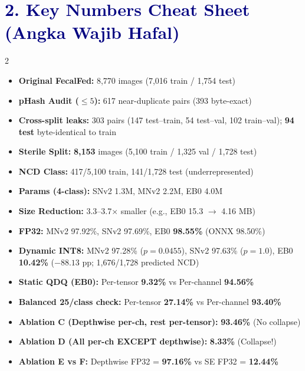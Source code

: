 \documentclass[10pt,a4paper]{article}
\begin{document}
\section*{\textcolor{navy}{2. Key Numbers Cheat Sheet (Angka Wajib Hafal)}}

\begin{multicols}{2}
\begin{tcolorbox}[colback=softblue, colframe=navy, title=\textbf{A. Dataset \& Models}, fonttitle=\small\bfseries, boxrule=0.6pt]
\small
\begin{itemize}[leftmargin=*, itemsep=2pt]
  \item \textbf{Original FecalFed:} 8,770 images (7,016 train / 1,754 test)
  \item \textbf{pHash Audit ($\le 5$):} 617 near-duplicate pairs (393 byte-exact)
  \item \textbf{Cross-split leaks:} 303 pairs (147 test--train, 54 test--val, 102 train--val); \textbf{94 test} byte-identical to train
  \item \textbf{Sterile Split:} \textbf{8,153} images (5,100 train / 1,325 val / 1,728 test)
  \item \textbf{NCD Class:} 417/5,100 train, 141/1,728 test (underrepresented)
  \item \textbf{Params (4-class):} SNv2 1.3M, MNv2 2.2M, EB0 4.0M
  \item \textbf{Size Reduction:} 3.3--3.7$\times$ smaller (e.g., EB0 15.3 $\to$ 4.16 MB)
\end{itemize}
\end{tcolorbox}

\begin{tcolorbox}[colback=softred, colframe=coral, title=\textbf{B. Accuracy \& Ablation (n = 1,728)}, fonttitle=\small\bfseries, boxrule=0.6pt]
\small
\begin{itemize}[leftmargin=*, itemsep=2pt]
  \item \textbf{FP32:} MNv2 97.92\%, SNv2 97.69\%, EB0 \textbf{98.55\%} (ONNX 98.50\%)
  \item \textbf{Dynamic INT8:} MNv2 97.28\% ($p=0.0455$), SNv2 97.63\% ($p=1.0$), EB0 \textbf{10.42\%} ($-88.13$ pp; 1,676/1,728 predicted NCD)
  \item \textbf{Static QDQ (EB0):} Per-tensor \textbf{9.32\%} vs Per-channel \textbf{94.56\%}
  \item \textbf{Balanced 25/class check:} Per-tensor \textbf{27.14\%} vs Per-channel \textbf{93.40\%}
  \item \textbf{Ablation C (Depthwise per-ch, rest per-tensor):} \textbf{93.46\%} (No collapse)
  \item \textbf{Ablation D (All per-ch EXCEPT depthwise):} \textbf{8.33\%} (Collapse!)
  \item \textbf{Ablation E vs F:} Depthwise FP32 = \textbf{97.16\%} vs SE FP32 = \textbf{12.44\%}
\end{itemize}
\end{tcolorbox}
\end{multicols}
\end{document}
